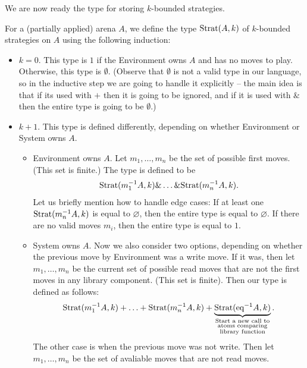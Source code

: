 We are now ready the type for storing $k$-bounded strategies. 
\begin{definition}
    For a (partially applied) arena $A$, we define the type $\text{Strat}(A, k)$ of $k$-bounded strategies on $A$ using the following induction:
\begin{itemize}
    \item $k=0$. This type is $1$ if the Environment owns $A$ and has no moves to play. Otherwise, this type is $\emptyset$.
          (Observe that $\emptyset$ is not a valid type in our language, so in the inductive step we are going to handle it explicitly --
          the main idea is that if its used with $+$ then it is going to be ignored,
          and if it is used with $\&$ then the entire type is going to be $\emptyset$.) 
    \item $k + 1$. This type is defined differently, depending on whether Environment or System owns $A$.
    \begin{itemize}
        \item Environment owns $A$. Let $m_1,\ldots,m_n$ be the set of possible first moves. (This set is finite.) The type is defined to be 
        \begin{align*}
            \text{Strat}(m_1^{-1}A, k) \& \ldots \& \text{Strat}(m_n^{-1}A, k).
        \end{align*}
        Let us briefly mention how to handle edge cases: If at least one $\text{Strat}(m_n^{-1}A, k)$ is equal to $\varnothing$, then 
        the entire type is equal to $\varnothing$. If there are no valid moves $m_i$, then the entire type is equal to $1$. 
        \item System owns $A$. Now we also consider two options, depending on whether the previous move by Environment was a write move. 
               If it was, then let $m_1, \ldots, m_n$ be the current set of possible read moves that are not the first moves in any library 
               component. (This set is finite). Then our type is defined as follows:
               \begin{align*}
                \text{Strat}(m_1^{-1}A, k) + \ldots + \text{Strat}(m_n^{-1}A, k) + \underbrace{\text{Strat}({\text{eq}}^{-1}A, k)}_{\substack{\textrm{Start a new call to}\\
                \textrm{atoms comparing}\\
                \textrm{library function}}}.
               \end{align*}
               The other case is when the previous move was not write. Then let $m_1, \ldots, m_n$ be the set of avaliable moves that are not read moves. 

\end{itemize}
\end{itemize}
\end{definition}
